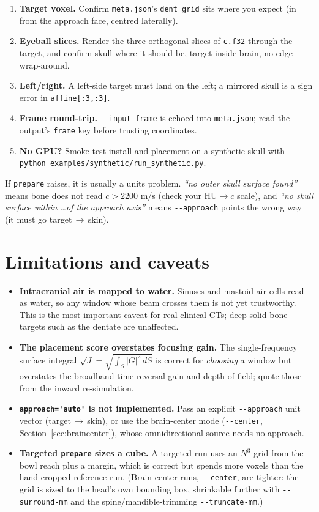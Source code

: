 \documentclass[10pt]{article}
\newcommand{\code}[1]{\lstinline[basicstyle=\ttfamily]|#1|}
\begin{document}
\begin{enumerate}[leftmargin=1.6em]
\item \textbf{Target voxel.} Confirm \code{meta.json}'s \code{dent_grid} sits where you
expect (in from the approach face, centred laterally).
\item \textbf{Eyeball slices.} Render the three orthogonal slices of \code{c.f32} through
the target, and confirm skull where it should be, target inside brain, no edge wrap-around.
\item \textbf{Left/right.} A left-side target must land on the left; a mirrored skull is
a sign error in \code{affine[:3,:3]}.
\item \textbf{Frame round-trip.} \code{--input-frame} is echoed into \code{meta.json};
read the output's \code{frame} key before trusting coordinates.
\item \textbf{No GPU?} Smoke-test install and placement on a synthetic skull with
\code{python examples/synthetic/run_synthetic.py}.
\end{enumerate}

If \code{prepare} raises, it is usually a units problem. \emph{``no outer skull surface found''}
means bone does not read $c>2200$ m/s (check your HU$\to c$ scale), and \emph{``no skull
surface within \dots of the approach axis''} means \code{--approach} points the wrong way
(it must go target\,$\to$\,skin).

\section{Limitations and caveats}\label{sec:limits}

\begin{itemize}[leftmargin=1.4em]
\item \textbf{Intracranial air is mapped to water.} Sinuses and mastoid air-cells read
as water, so any window whose beam crosses them is not yet trustworthy. This is the most
important caveat for real clinical CTs; deep solid-bone targets such as the dentate are
unaffected.
\item \textbf{The placement score overstates focusing gain.} The single-frequency
surface integral $\sqrt{J}=\sqrt{\int_S|G|^2\,dS}$ is correct for \emph{choosing} a
window but overstates the broadband time-reversal gain and depth of field; quote those
from the inward re-simulation.
\item \textbf{\code{approach='auto'} is not implemented.} Pass an explicit
\code{--approach} unit vector (target\,$\to$\,skin), or use the brain-center mode
(\code{--center}, Section~\ref{sec:braincenter}), whose omnidirectional source needs no
approach.
\item \textbf{Targeted \code{prepare} sizes a cube.} A targeted run uses an $N^3$ grid
from the bowl reach plus a margin, which is correct but spends more voxels than the
hand-cropped reference run. (Brain-center runs, \code{--center}, are tighter: the grid is
sized to the head's own bounding box, shrinkable further with \code{--surround-mm} and the
spine/mandible-trimming \code{--truncate-mm}.)
\end{itemize}
\end{document}
